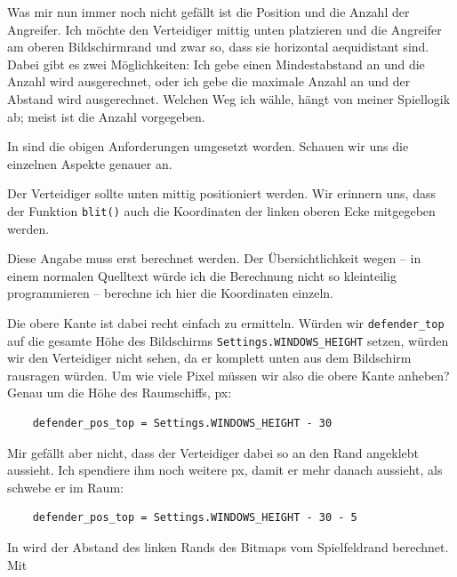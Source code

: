 Was mir nun immer noch nicht gefällt ist die Position und die Anzahl der Angreifer. Ich möchte den Verteidiger mittig unten platzieren und die Angreifer am oberen Bildschirmrand und zwar so, dass sie horizontal  \gls{aequidistant} sind. Dabei gibt es zwei Möglichkeiten: Ich gebe einen Mindestabstand an und die Anzahl wird ausgerechnet, oder ich gebe die maximale Anzahl an und der Abstand wird ausgerechnet. Welchen Weg ich wähle, hängt von meiner Spiellogik ab; meist ist die Anzahl vorgegeben.


In  sind die obigen Anforderungen umgesetzt worden. Schauen wir uns die einzelnen Aspekte genauer an.

Der Verteidiger sollte unten mittig positioniert werden. Wir erinnern uns, dass der Funktion \texttt{blit()} auch die Koordinaten der linken oberen Ecke mitgegeben werden. 

Diese Angabe muss erst berechnet werden. Der Übersichtlichkeit wegen -- in einem normalen Quelltext würde ich die Berechnung nicht so kleinteilig programmieren -- berechne ich hier die Koordinaten einzeln.

Die obere Kante ist dabei recht einfach zu ermitteln. Würden wir \texttt{defender\_top} auf die gesamte Höhe des Bildschirms \texttt{Settings.WINDOWS\_HEIGHT} setzen, würden wir den Verteidiger nicht sehen, da er komplett unten aus dem Bildschirm rausragen würden. Um wie viele Pixel müssen wir also die obere Kante anheben? Genau um die Höhe des Raumschiffs, \unit[30]{px}:

\lstset{firstnumber=23}
\begin{lstlisting}
	defender_pos_top = Settings.WINDOWS_HEIGHT - 30
\end{lstlisting}

Mir gefällt aber nicht, dass der Verteidiger dabei so an den Rand angeklebt aussieht. Ich spendiere ihm noch weitere \unit[5]{px}, damit er mehr danach aussieht, als schwebe er im Raum:

\lstset{firstnumber=23}
\begin{lstlisting}
	defender_pos_top = Settings.WINDOWS_HEIGHT - 30 - 5
\end{lstlisting}

In  wird der Abstand des linken Rands des Bitmaps vom Spielfeldrand berechnet. Mit

